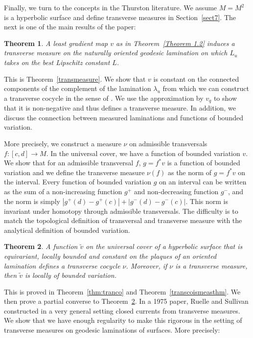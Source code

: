 \documentclass{ip-journal}
\newtheorem{theorem}{Theorem}[section]
\theoremstyle{definition}
\numberwithin{equation}{section}
\begin{document}
Finally, we turn to the concepts in the Thurston literature.  We assume $M = M^2$ is a hyperbolic surface and define transverse measures in Section~\ref{sect7}. The next is one of the main results of the paper:
\begin{theorem} A least gradient map $v$ as in Theorem~\ref{Theorem 1.2}  induces a transverse measure on the naturally oriented geodesic lamination on which $L_u$ takes on the best Lipschitz constant $L$.
\end{theorem}
This is Theorem~\ref{transmeasure}. We show that $v$ is constant on the connected components of the complement of the lamination $\lambda_u$ from which we can construct a transverse cocycle in the sense of \cite{bonahon2}. We use the approximation by $v_q$ to show that it is non-negative and thus defines a transverse measure.  In addition, we discuss the connection between measured laminations and functions of bounded variation.

 More precisely,  we construct a measure $\nu$ on admissible transversals $f:[c,d] \rightarrow M.$  In the universal cover, we have a function of bounded variation $v.$  We show that for an admissible transversal $f$, $g = f^*v$ is a function of bounded variation and we define the transverse measure $\nu(f)$ as the norm of $g = f^*v$ on the interval.  Every function of bounded variation $g$ on an interval can be written as the sum of a non-increasing function $g^+$ and  non-decreasing function $g^-$, and the norm  is simply $|g^+(d) - g^+(c)| + |g^-(d) - g^-(c)|.$  This norm is invariant under homotopy through admissible transversals.  The difficulty is to match the topological definition of transversal and transverse measure with the analytical definition of  bounded variation.

\begin{theorem}\label{bird} A function $\tilde v$ on the universal cover of a hyperbolic surface that is equivariant, locally bounded and constant on the plaques of an oriented lamination defines a transverse cocycle $\nu$. Moreover,  if  $\nu$  is a transverse measure, then $\tilde v$ is locally of bounded variation.
  \end{theorem}

This is proved in Theorem~\ref{thm:tranco} and Theorem~\ref{transcoismeasthm}. 
We then  prove a partial converse to Theorem~\ref{bird}. In a 1975 paper, Ruelle and Sullivan constructed in a very general setting  closed currents from transverse measures. We show that we have enough regularity to make this rigorous in the setting of transverse measures on geodesic laminations of surfaces.
 More precisely:
\end{document}
